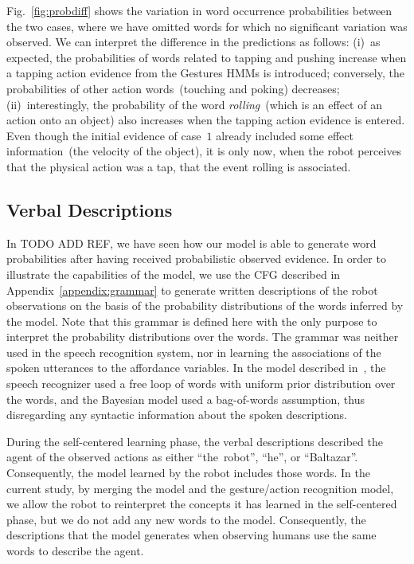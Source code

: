 Fig.~\ref{fig:probdiff} shows the variation in word occurrence probabilities between the two cases, where we have omitted words for which no significant variation was observed.
We can interpret the difference in the predictions as follows: (i)~as expected, the probabilities of words related to tapping and pushing increase when a tapping action evidence from the Gestures \acp{HMM} is introduced; conversely, the probabilities of other action words~(touching and poking) decreases; (ii)~interestingly, the probability of the word \emph{rolling}~(which is an effect of an action onto an object) also increases when the tapping action evidence is entered. Even though the initial evidence of case~$1$ already included some effect information~(the velocity of the object), it is only now, when the robot perceives that the physical action was a tap, that the event rolling is associated.

\subsection{Verbal Descriptions}

In TODO ADD REF, we have seen how our model is able to generate word probabilities after having received probabilistic observed evidence.
In order to illustrate the capabilities of the model, we use the \ac{CFG} described in Appendix~\ref{appendix:grammar} to generate written descriptions of the robot observations on the basis of the probability distributions of the words inferred by the model.
Note that this grammar is defined here with the only purpose to interpret the probability distributions over the words.
The grammar was neither used in the speech recognition system, nor in learning the associations of the spoken utterances to the affordance variables.
In the model described in~\cite{salvi:2012:smcb}, the speech recognizer used a free loop of words with uniform prior distribution over the words, and the Bayesian model used a bag-of-words assumption, thus disregarding any syntactic information about the spoken descriptions.

During the self-centered learning phase, the verbal descriptions described the agent of the observed actions as either ``the~robot'', ``he'', or ``Baltazar''.
Consequently, the \AffWords{} model learned by the robot includes those words.
In the current study, by merging the \AffWords{} model and the gesture/action recognition model, we allow the robot to reinterpret the concepts it has learned in the self-centered phase, but we do not add any new words to the model.
Consequently, the descriptions that the model generates when observing humans use the same words to describe the agent.

